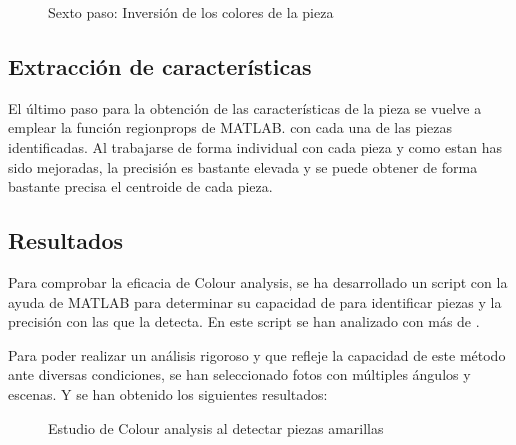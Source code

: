 \begin{figure}[ht!]  %
  \hfill	
  \hfill	
\caption{Sexto paso: Inversión de los colores de la pieza}
\label{fig:mejora7}
\vspace{-5pt}
\end{figure}

\newpage
\subsection{Extracción de características}
El último paso para la obtención de las características de la pieza se vuelve a emplear la función regionprops de MATLAB. con cada una de las piezas identificadas. Al trabajarse de forma individual con cada pieza y como estan has sido mejoradas, la precisión es bastante elevada y se puede obtener de forma bastante precisa el centroide de cada pieza.

\subsection{Resultados}
Para comprobar la eficacia de Colour analysis, se ha desarrollado un script con la ayuda de MATLAB para determinar su capacidad de para identificar piezas y la precisión con las que la detecta. En este script se han analizado  con más de .

Para poder realizar un análisis rigoroso y que refleje la capacidad de este método ante diversas condiciones, se han seleccionado fotos con múltiples ángulos y escenas. Y se han obtenido los siguientes resultados:

\begin{figure}[ht]  %
  \hfill	
\caption{Estudio de Colour analysis al detectar piezas amarillas}
\label{fig:yellow colour}
\vspace{-5pt}
\end{figure}

